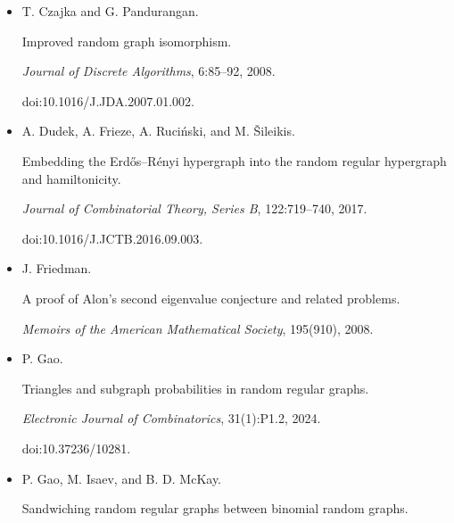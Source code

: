 \begin{itemize}
N. A. Cook, L. Goldstein, and T. Johnson.


Size biased couplings and the spectral gap for random regular graphs.


\emph{Annals of Probability}, 46(1):72–125, 2018.





\item[] 
[18]

T. Czajka and G. Pandurangan.


Improved random graph isomorphism.


\emph{Journal of Discrete Algorithms}, 6:85–92, 2008.


doi:10.1016/J.JDA.2007.01.002.





\item[] 
[19]

A. Dudek, A. Frieze, A. Ruciński, and M. Šileikis.


Embedding the Erdős–Rényi hypergraph into the random
regular hypergraph and hamiltonicity.


\emph{Journal of Combinatorial Theory, Series B}, 122:719–740, 2017.


doi:10.1016/J.JCTB.2016.09.003.





\item[] 
[20]

J. Friedman.


A proof of Alon’s second eigenvalue conjecture and related
problems.


\emph{Memoirs of the American Mathematical Society}, 195(910), 2008.





\item[] 
[21]

P. Gao.


Triangles and subgraph probabilities in random regular graphs.


\emph{Electronic Journal of Combinatorics}, 31(1):P1.2, 2024.


doi:10.37236/10281.





\item[] 
[22]

P. Gao, M. Isaev, and B. D. McKay.


Sandwiching random regular graphs between binomial random graphs.



\end{itemize}
